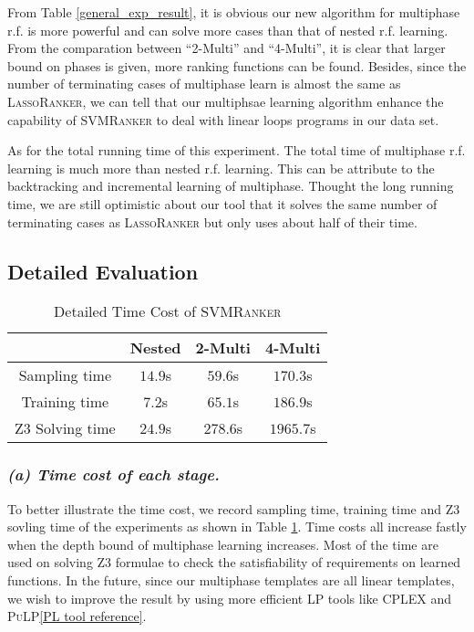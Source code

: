 \documentclass[UTF-8]{article}
\begin{document}
From Table \ref{general_exp_result}, it is obvious our new algorithm for multiphase r.f. is more powerful and can solve more cases than that of nested r.f. learning. From the comparation between ``2-Multi'' and ``4-Multi'', it is clear that larger bound on phases is given, more ranking functions can be found. Besides, since the number of terminating cases of multiphase learn is almost the same as \textsc{LassoRanker}, we can tell that our multiphsae learning algorithm enhance the capability of \textsc{SVMRanker} to deal with linear loops programs in our data set. 

As for the total running time of this experiment. The total time of multiphase r.f. learning is much more than nested r.f. learning. This can be attribute to the backtracking and incremental learning of multiphase. Thought the long running time, we are still optimistic about our tool that it solves the same number of terminating cases as \textsc{LassoRanker} but only uses about half of their time.


\subsection{Detailed Evaluation}
\begin{table}
\centering
\begin{tabular}{c|c|c|c}

& Nested & 2-Multi & 4-Multi\\
\hline
Sampling time & $14.9$s& $59.6$s& $170.3$s \\
Training time & $7.2$s& $65.1$s& $186.9$s\\
Z3 Solving time & $24.9$s& $278.6$s& $1965.7$s\\

\end{tabular}
\caption{Detailed Time Cost of \textsc{SVMRanker}}
\label{detailed_time}
\end{table}


\subsubsection{
\textit{(a) Time cost of each stage.}}
To better illustrate the time cost, we record sampling time, training time and Z3 sovling time of the experiments as shown in Table \ref{detailed_time}. Time costs all increase fastly when the depth bound of multiphase learning increases. Most of the time are used on solving Z3 formulae to check the satisfiability of requirements on learned functions. In the future, since our multiphase templates are all linear templates, we wish to improve the result by using more efficient LP tools like \textsc{CPLEX} and \textsc{PuLP}\ref{PL tool reference}.
\end{document}
